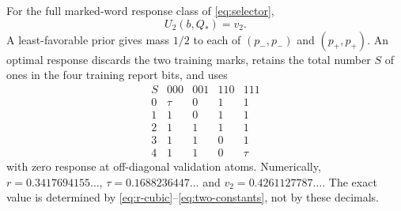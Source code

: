 \begin{theorem}\label{thm:two-saddle}
For the full marked-word response class of \eqref{eq:selector},
\[
                   U_2(b,Q_*)=v_2.
\]
A least-favorable prior gives mass $1/2$ to each of $(p_-,p_-)$ and
$(p_+,p_+)$. An optimal response discards the two training marks, retains
the total number $S$ of ones in the four training report bits, and uses
\begin{equation}\label{eq:two-response}
\begin{array}{c|rrrr}
 S&000&001&110&111\\\hline
 0&\tau&0&1&1\\
 1&1&0&1&1\\
 2&1&1&1&1\\
 3&1&1&0&1\\
 4&1&1&0&\tau
\end{array}
\end{equation}
with zero response at off-diagonal validation atoms. Numerically,
$r=0.3417694155\ldots$, $\tau=0.1688236447\ldots$ and
$v_2=0.4261127787\ldots$. The exact value is determined by
\eqref{eq:r-cubic}--\eqref{eq:two-constants}, not by these decimals.
\end{theorem}
